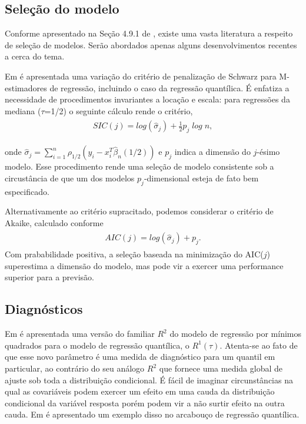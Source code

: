 \documentclass[paper=a4, fontsize=11pt]{scrartcl}
\numberwithin{equation}{section}		%
\numberwithin{figure}{section}			%
\numberwithin{table}{section}				%
\begin{document}
\subsection{Seleção do modelo}
Conforme apresentado na Seção 4.9.1 de \cite{koenker2005quantile}, existe uma vasta literatura a respeito de seleção de modelos. Serão abordados apenas alguns desenvolvimentos recentes a cerca do tema. 

Em \cite{machado1993robust} é apresentada uma variação do critério de penalização de Schwarz para M-estimadores de regressão, incluindo o caso da regressão quantílica. É enfatiza a necessidade de procedimentos invariantes a locação e escala: para regressões da mediana ($\tau$=1/2) o seguinte cálculo rende o critério,
\vspace{-10pt}
\begin{align} 
	\begin{split}
	SIC(j) = log(\hat{\sigma}_{j})+\frac{1}{2}p_{j}\;log\;n,\label{eq:SIC}
	\end{split}					
\end{align}

{\parindent0pt onde $\hat{\sigma}_{j}=\sum_{i=1}^{n} \rho_{1/2}(y_{i}-x^{T}_{i}\hat{\beta}_{n}(1/2))$ e $p_{j}$ indica a dimensão do $j$-ésimo modelo. Esse procedimento rende uma seleção de modelo consistente sob a circustância de que um dos modelos $p_{j}$-dimensional esteja de fato bem especificado.}

Alternativamente ao critério supracitado, podemos considerar o critério de Akaike, calculado conforme
\vspace{-10pt}
\begin{align} 
	\begin{split}
	AIC(j) = log(\hat{\sigma}_{j})+p_{j}.\label{eq:AIC}
	\end{split}					
\end{align}
Com prababilidade positiva, a seleção baseada na minimização do AIC($j$) superestima a dimensão do modelo, mas pode vir a exercer uma performance superior para a previsão. 


\subsection{Diagnósticos}
Em \cite{koenker1999goodness} é apresentada uma versão do familiar $ R^{2} $ do modelo de regressão por mínimos quadrados para o modelo de regressão quantílica, o $ R^{1}(\tau) $. Atenta-se ao fato de que esse novo parâmetro é uma medida de diagnóstico para um quantil em particular, ao contrário do seu análogo $ R^{2} $ que fornece uma medida global de ajuste sob toda a distribuição condicional. É fácil de imaginar circunstâncias na qual as covariáveis podem exercer um efeito em uma cauda da distribuição condicional da variável resposta porém podem vir a não surtir efeito na outra cauda. Em \cite{chamberlain1994quantile} é apresentado um exemplo disso no arcabouço de regressão quantílica. 
\end{document}
